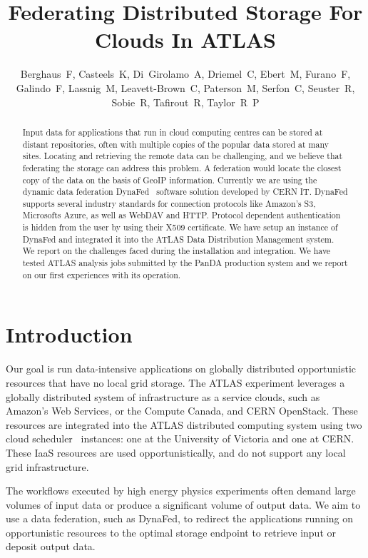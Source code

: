 \documentclass[a4paper]{jpconf}
\begin{document}
\title{Federating Distributed Storage For Clouds In ATLAS}

\author{Berghaus~F, Casteels~K, Di~Girolamo~A, Driemel~C, Ebert~M, Furano~F, Galindo~F, Lassnig~M, Leavett-Brown~C, Paterson~M, Serfon~C, Seuster~R, Sobie~R, Tafirout~R, Taylor~R~P}

\address{Frank~Berghaus, G07810, CERN, CH-1211 Geneva 23,  Switzerland}


\begin{abstract}
Input data for applications that run in cloud computing centres can be stored at distant repositories, often with multiple copies of the popular data stored at many sites. Locating and retrieving the remote data can be challenging, and we believe that federating the storage can address this problem. A federation would locate the closest copy of the data on the basis of GeoIP information. Currently we are using the dynamic data federation DynaFed~\cite{dynafed} software solution developed by CERN IT. DynaFed supports several industry standards for connection protocols like Amazon's S3, Microsofts Azure, as well as WebDAV and HTTP. Protocol dependent authentication is hidden from the user by using their X509 certificate. We have setup an instance of DynaFed and integrated it into the ATLAS Data Distribution Management system. We report on the challenges faced during the installation and integration. We have tested ATLAS analysis jobs submitted by the PanDA production system and we report on our first experiences with its operation.
\end{abstract}

\section{Introduction}
Our goal is run data-intensive applications on globally distributed opportunistic resources that have no local grid storage. The ATLAS experiment leverages a globally distributed system of infrastructure as a service clouds, such as Amazon's Web Services, or the Compute Canada, and CERN OpenStack. These resources are integrated into the ATLAS distributed computing system using two cloud scheduler~\cite{cloud-scheduler} instances: one at the University of Victoria and one at CERN. These IaaS resources are used opportunistically, and do not support any local grid infrastructure.

The workflows executed by high energy physics experiments often demand large volumes of input data or produce a significant volume of output data. We aim to use a data federation, such as DynaFed, to redirect the applications running on opportunistic resources to the optimal storage endpoint to retrieve input or deposit output data.
\end{document}
